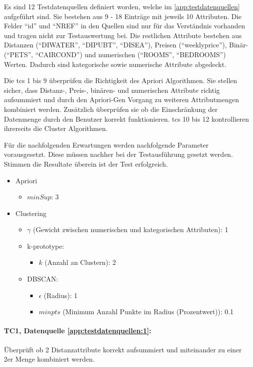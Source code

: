 Es sind 12 Testdatenquellen definiert worden, welche im \cref{app:testdatenquellen} aufgeführt sind.
Sie bestehen aus 9 - 18 Einträge mit jeweils 10 Attributen. Die Felder "`id"' und "`NREF"' in den Quellen sind nur für das Verständnis vorhanden und tragen nicht zur Testauswertung bei. Die restlichen Attribute bestehen aus Distanzen ("`DIWATER"', "`DIPUBT"', "`DISEA"'), Preisen ("`weeklyprice"'), Binär- ("`PETS"', "`CAIRCOND"') und numerischen ("`ROOMS"', "`BEDROOMS"') Werten. Dadurch sind kategorische sowie numerische Attribute abgedeckt. 

Die \glspl{tc} 1 bis 9 überprüfen die Richtigkeit des Apriori Algorithmen. Sie stellen sicher, dass Distanz-, Preis-, binären- und numerischen Attribute richtig aufsummiert und durch den Apriori-Gen Vorgang zu weiteren Attributmengen kombiniert werden. Zusätzlich überprüfen sie ob die Einschränkung der Datenmenge durch den Benutzer korrekt funktionieren. \glspl{tc} 10 bis 12 kontrollieren ihrerseits die Cluster Algorithmen. 

Für die nachfolgenden Erwartungen werden nachfolgende Parameter vorausgesetzt. Diese müssen nachher bei der Testausführung gesetzt werden. Stimmen die Resultate überein ist der Test erfolgreich. 
\begin{itemize}
	\item Apriori
	\begin{itemize}
		\item $minSup$: 3
	\end{itemize}
	
	\item Clustering
	\begin{itemize}
		\item $\gamma$ (Gewicht zwischen numerischen und kategorischen Attributen): 1
		\item k-prototype:
		\begin{itemize}
			\item $k$ (Anzahl an Clustern): 2
		\end{itemize}
		\item DBSCAN:
		\begin{itemize}
			\item $\epsilon$ (Radius): 1
			\item $minpts$ (Minimum Anzahl Punkte im Radius (Prozentwert)): 0.1
		\end{itemize}
	\end{itemize}
\end{itemize}

\paragraph{TC1, Datenquelle \cref{app:testdatenquellen:1}:} Überprüft ob 2 Distanzattribute korrekt aufsummiert und miteinander zu einer 2er Menge kombiniert werden. 

